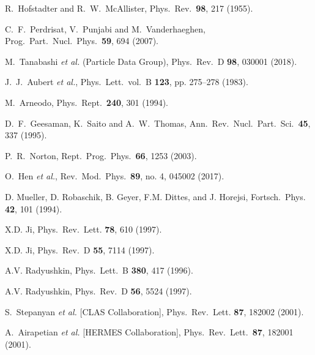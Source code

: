 \documentclass[twocolumn,nofootinbib,prl,superscriptaddress,secnumarabic,amssymb,nobibnotes,aps,floatfix]{revtex4}
\begin{document}
\begin{thebibliography}{99}

 R.~Hofstadter and R.~W.~McAllister,
Phys.\ Rev.\  {\bf 98}, 217 (1955).

 C.~F.~Perdrisat, V.~Punjabi and M.~Vanderhaeghen,
Prog.\ Part.\ Nucl.\ Phys.\  {\bf 59}, 694 (2007).

 M.~Tanabashi {\it et al.} (Particle Data Group), Phys.\ Rev.\ D 
   {\bf 98}, 030001 (2018).

   J.~J.~Aubert {\it et al.}, 
      Phys.\ Lett.\, vol.\ B { \bf 123}, pp. 275–278 (1983).

  M.~Arneodo,
  Phys.\ Rept.\  {\bf 240}, 301 (1994).

  D.~F.~Geesaman, K.~Saito and A.~W.~Thomas,
  Ann.\ Rev.\ Nucl.\ Part.\ Sci.\  {\bf 45}, 337 (1995).

  P.~R.~Norton,
  Rept.\ Prog.\ Phys.\  {\bf 66}, 1253 (2003).

  O.~Hen {\it et al.},
  Rev.\ Mod.\ Phys.\  {\bf 89}, no. 4, 045002 (2017).

 D. Mueller, D. Robaschik, B. Geyer, F.M. Dittes, and 
   J.  Horejsi,
Fortsch.\ Phys. {\bf 42}, 101 (1994).
  
X.D. Ji,
Phys.\ Rev.\ Lett. {\bf 78}, 610 (1997).

X.D. Ji,
Phys.\ Rev.\ D {\bf 55}, 7114 (1997).

A.V. Radyushkin,
Phys.\ Lett.\  B {\bf 380}, 417 (1996).

A.V. Radyushkin,
Phys.\ Rev.\ D {\bf 56}, 5524 (1997).

S.~Stepanyan {\it et al.} [CLAS Collaboration],
Phys.\ Rev.\ Lett. {\bf 87}, 182002 (2001).

 A.~Airapetian {\it et al.} [HERMES Collaboration],
 Phys.\ Rev.\ Lett.\  {\bf 87}, 182001 (2001).


\end{thebibliography}
\end{document}
